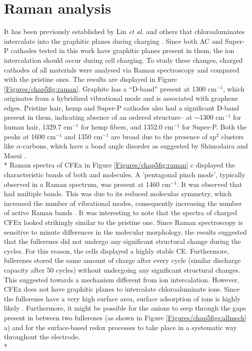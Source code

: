 \section*{Raman analysis}
It has been previously established by Lin \textit{et al.} and others that chloroaluminates intercalate into the graphitic planes during charging \cite{lin_ultrafast_2015}. Since both AC and Super-P cathodes tested in this work have graphitic planes present in them, the ion intercalation should occur during cell charging. To study these changes, charged cathodes of all materials were analysed via Raman spectroscopy and compared with the pristine ones. The results are displayed in Figure \ref{Figures/chap5fig:raman}. Graphite has a \enquote{D-band} present at 1300 cm$^{-1}$, which originates from a hybridized vibrational mode and is associated with graphene edges. Pristine hair, hemp and Super-P cathodes also had a significant D-band present in them, indicating absence of an ordered structure-- at $\sim$1300 cm$^{-1}$ for human hair, 1329.7 cm$^{-1}$ for hemp fibers, and 1352.0 cm$^{-1}$ for Super-P. Both the peaks at 1600 cm$^{-1}$ and 1350 cm$^{-1}$ are broad due to the presence of sp$^2$ clusters like $\alpha$-carbons, which have a bond angle disorder as suggested by Shimodaira and Masui \cite{shimodaira_raman_2002}.\\*
Raman spectra of CFEx in Figure \ref{Figures/chap5fig:raman} c displayed the characteristic bands of both  and  molecules. A 'pentagonal pinch mode', typically observed in a  Raman spectrum, was present at 1460 cm$^{-1}$. It was observed that  had multiple bands. This was due to its reduced molecular symmetry, which increased the number of vibrational modes, consequently increasing the number of active Raman bands \cite{kimbrell_analysis_2014}. It was interesting to note that the spectra of charged CFEx looked strikingly similar to the pristine one. Since Raman spectroscopy is sensitive to minute differences in the molecular morphology, the results suggested that the fullerenes did not undergo any significant structural change during the cycles. For this reason, the cells displayed a highly stable CE. Furthermore, fullerenes stored the same amount of charge after every cycle (similar discharge capacity after 50 cycles) without undergoing any significant structural changes. This suggested towards a mechanism different from ion intercalation. However, CFEx does not have graphitic planes to intercalate chloroaluminate ions. Since the fullerenes have a very high surface area, surface adsorption of ions is highly likely \cite{adams_van_1994}. Furthermore, it might be possible for the anions to seep through the gaps present in between two fullerenes (as shown in Figure \ref{Figures/chap5figs:allmech} a) and for the surface-based redox processes to take place in a systematic way throughout the electrode.\\* 
